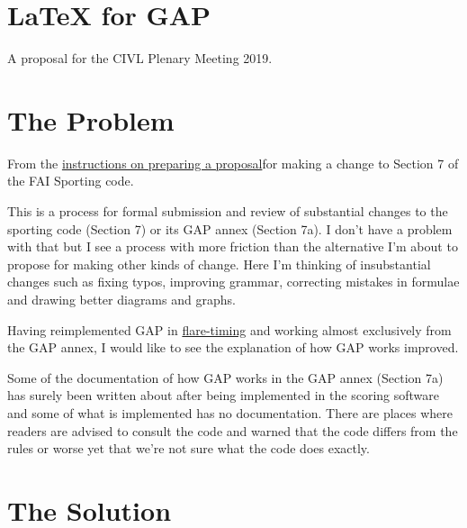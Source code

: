 \documentclass{article}
\begin{document}
\section*{LaTeX for GAP}

A proposal for the CIVL Plenary Meeting 2019.

\section{The Problem}


From the \href{https://www.fai.org/news/civl-plenary-2019}{instructions on
preparing a proposal}for making a change to Section 7 of the FAI Sporting code.

This is a process for formal submission and review of substantial changes to
the sporting code (Section 7) or its GAP annex (Section 7a). I don't have
a problem with that but I see a process with more friction than the alternative
I'm about to propose for making other kinds of change. Here I'm thinking of
insubstantial changes such as fixing typos, improving grammar, correcting
mistakes in formulae and drawing better diagrams and graphs.

Having reimplemented GAP in
\href{https://github.com/BlockScope/flare-timing}{flare-timing} and working
almost exclusively from the GAP annex, I would like to see the explanation of
how GAP works improved.

Some of the documentation of how GAP works in the GAP annex (Section 7a) has
surely been written about after being implemented in the scoring software and
some of what is implemented has no documentation.  There are places where
readers are advised to consult the code and warned that the code differs from
the rules or worse yet that we're not sure what the code does exactly.

\section{The Solution}
\end{document}
